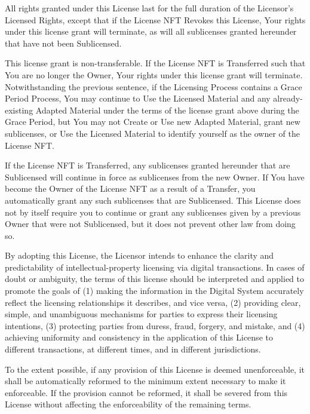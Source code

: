 \documentclass{article}
\newcommand{\sect}[1]{\vspace{12pt}\noindent{\strong{#1}}}
\begin{document}
\begin{sffamily}
All rights granted under this License last for the full duration of the Licensor's Licensed Rights, except that if the License NFT Revokes this License, Your rights under this license grant will terminate, as will all sublicenses granted hereunder that have not been Sublicensed.

This license grant is non-transferable. If the License NFT is Transferred such that You are no longer the Owner, Your rights under this license grant will terminate. Notwithstanding the previous sentence, if the Licensing Process contains a Grace Period Process, You may continue to Use the Licensed Material and any already-existing Adapted Material under the terms of the license grant above during the Grace Period, but You may not Create or Use new Adapted Material, grant new sublicenses, or Use the Licensed Material to identify yourself as the owner of the License NFT.

If the License NFT is Transferred, any sublicenses granted hereunder that are Sublicensed will continue in force as sublicenses from the new Owner. If You have become the Owner of the License NFT as a result of a Transfer, you automatically grant any such sublicenses that are Sublicensed. This License does not by itself require you to continue or grant any sublicenses given by a previous Owner that were not Sublicensed, but it does not prevent other law from doing so.


\sect{Interpretation}

By adopting this License, the Licensor intends to enhance the clarity and predictability of intellectual-property licensing via digital transactions. In cases of doubt or ambiguity, the terms of this license should be interpreted and applied to promote the goals of (1) making the information in the Digital System accurately reflect the licensing relationships it describes, and vice versa, (2) providing clear, simple, and unambiguous mechanisms for parties to express their licensing intentions, (3) protecting parties from duress, fraud, forgery, and mistake, and (4) achieving uniformity and consistency in the application of this License to different transactions, at different times, and in different jurisdictions.

To the extent possible, if any provision of this License is deemed unenforceable, it shall be automatically reformed to the minimum extent necessary to make it enforceable. If the provision cannot be reformed, it shall be severed from this License without affecting the enforceability of the remaining terms.


\end{sffamily}
\end{document}
